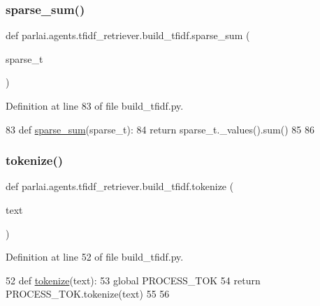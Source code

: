 \subsubsection{\texorpdfstring{sparse\+\_\+sum()}{sparse\_sum()}}
{\footnotesize\ttfamily def parlai.\+agents.\+tfidf\+\_\+retriever.\+build\+\_\+tfidf.\+sparse\+\_\+sum (\begin{DoxyParamCaption}\item[{}]{sparse\+\_\+t }\end{DoxyParamCaption})}



Definition at line 83 of file build\+\_\+tfidf.\+py.


\begin{DoxyCode}
83 \textcolor{keyword}{def }\hyperlink{namespaceparlai_1_1agents_1_1tfidf__retriever_1_1build__tfidf_a8852c505db2852b5e39be3468a9c1733}{sparse\_sum}(sparse\_t):
84     \textcolor{keywordflow}{return} sparse\_t.\_values().sum()
85 
86 
\end{DoxyCode}
\mbox{\label{namespaceparlai_1_1agents_1_1tfidf__retriever_1_1build__tfidf_a1fdb457e98eb4e4c26047e229686a616}} 
\subsubsection{\texorpdfstring{tokenize()}{tokenize()}}
{\footnotesize\ttfamily def parlai.\+agents.\+tfidf\+\_\+retriever.\+build\+\_\+tfidf.\+tokenize (\begin{DoxyParamCaption}\item[{}]{text }\end{DoxyParamCaption})}



Definition at line 52 of file build\+\_\+tfidf.\+py.


\begin{DoxyCode}
52 \textcolor{keyword}{def }\hyperlink{namespaceparlai_1_1agents_1_1tfidf__retriever_1_1build__tfidf_a1fdb457e98eb4e4c26047e229686a616}{tokenize}(text):
53     \textcolor{keyword}{global} PROCESS\_TOK
54     \textcolor{keywordflow}{return} PROCESS\_TOK.tokenize(text)
55 
56 
\end{DoxyCode}
\mbox{\label{namespaceparlai_1_1agents_1_1tfidf__retriever_1_1build__tfidf_a5bd546d494142d2d7e2772a3d60583f9}} 
